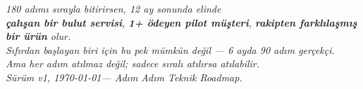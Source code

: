\documentclass[11pt,a4paper]{article}
\begin{document}
\vspace{0.8cm}
\begin{center}
\textit{180 adımı sırayla bitirirsen, 12 ay sonunda elinde\\
\textbf{çalışan bir bulut servisi}, \textbf{1+ ödeyen pilot müşteri}, \textbf{rakipten farklılaşmış bir ürün} olur.\\[6pt]
Sıfırdan başlayan biri için bu pek mümkün değil --- 6 ayda 90 adım gerçekçi.\\
Ama her adım atılmaz değil; sadece sıralı atılırsa atılabilir.}\\[1cm]
\textit{Sürüm v1, \today --- Adım Adım Teknik Roadmap.}
\end{center}
\end{document}
